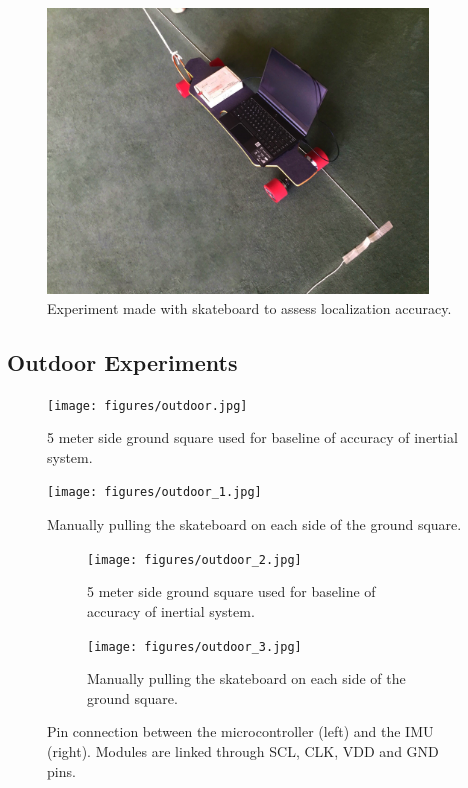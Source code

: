 \begin{figure}[!h]
    \centering
    \includegraphics[width=0.9\textwidth]{figures/indoor_2.jpg}
    \caption{ Experiment made with skateboard to assess localization accuracy. }
    \label{fig:indoor_2}
\end{figure}

\subsection{Outdoor Experiments}
\begin{figure}[!h]
    \centering
    \texttt{[image: figures/outdoor.jpg]}
    \caption{ 5 meter side ground square used for baseline of accuracy of inertial system. }
    \label{fig:outdoor}
\end{figure}

\begin{figure}[!h]
    \centering
    \texttt{[image: figures/outdoor\_1.jpg]}
    \caption{ Manually pulling the skateboard on each side of the ground square. }
    \label{fig:outdoor_1}
\end{figure}

\begin{figure}[!h]
    \centering
    \begin{subfigure}{0.49\textwidth}
        \centering
        \texttt{[image: figures/outdoor\_2.jpg]}
        \caption{5 meter side ground square used for baseline of accuracy of inertial system.}
        \label{fig:outdoor_2}
    \end{subfigure}
    \begin{subfigure}{0.49\textwidth}
        \centering
        \texttt{[image: figures/outdoor\_3.jpg]}
        \caption{ Manually pulling the skateboard on each side of the ground square. }
        \label{fig:outdoor_3}
    \end{subfigure}
    \caption{Pin connection between the microcontroller (left) and the IMU (right). Modules are linked through SCL, CLK, VDD and GND pins.}
    \label{fig:hardware}
\end{figure}